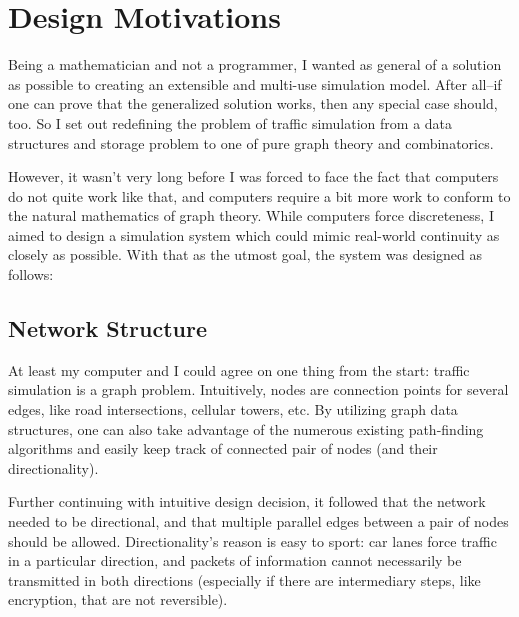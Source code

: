 \chapter{Design Motivations}
\label{Motivations}

\par Being a mathematician and not a programmer, I wanted as general of a solution as possible to creating an extensible and multi-use simulation model.  After all--if one can prove that the generalized solution works, then any special case should, too.  So I set out redefining the problem of traffic simulation from a data structures and storage problem to one of pure graph theory and combinatorics. \\

\par  However, it wasn't very long before I was forced to face the fact that computers do not quite work like that, and computers require a bit more work to conform to the natural mathematics of graph theory.  While computers force discreteness, I aimed to design a simulation system which could mimic real-world continuity as closely as possible.  With that as the utmost goal, the system was designed as follows: \\

\section{Network Structure}
\par At least my computer and I could agree on one thing from the start:  traffic simulation is a graph problem.  Intuitively, nodes are connection points for several edges, like road intersections, cellular towers, etc.  By utilizing graph data structures, one can also take advantage of the numerous existing path-finding algorithms and easily keep track of connected pair of nodes (and their directionality). \\

\par Further continuing with intuitive design decision, it followed that the network needed to be directional, and that multiple parallel edges between a pair of nodes should be allowed.  Directionality's reason is easy to sport:  car lanes force traffic in a particular direction, and packets of information cannot necessarily be transmitted in both directions (especially if there are intermediary steps, like encryption, that are not reversible). \\  

